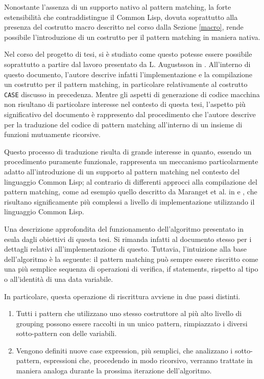 Nonostante l'assenza di un supporto nativo al pattern matching, la forte
estensibilità che contraddistingue il Common Lisp, dovuta soprattutto alla
presenza del costrutto macro descritto nel corso dalla Sezione \ref{macro},
rende possibile l'introduzione di un costrutto per il pattern matching in
maniera nativa.

Nel corso del progetto di tesi, si è studiato come questo potesse essere
possibile soprattutto a partire dal lavoro presentato da L. Augustsson in
\cite{DBLP:conf/fpca/Augustsson85}. All'interno di questo documento, l'autore
descrive infatti l'implementazione e la compilazione un costrutto per il pattern
matching, in particolare relativamente al costrutto \texttt{CASE} discusso in
precedenza. Mentre gli aspetti di generazione di codice macchina non risultano
di particolare interesse nel contesto di questa tesi, l'aspetto più
significativo del documento è rappresento dal procedimento che l'autore descrive
per la traduzione del codice di pattern matching all'interno di un insieme di
funzioni mutuamente ricorsive.

Questo processo di traduzione risulta di grande interesse in quanto, essendo un
procedimento puramente funzionale, rappresenta un meccanismo particolarmente
adatto all'introduzione di un supporto al pattern matching nel contesto del
linguaggio Common Lisp; al contrario di differenti approcci alla compilazione
del pattern matching, come ad esempio quello descritto da Maranget et al. in
\cite{DBLP:conf/icfp/FessantM01} e \cite{DBLP:conf/lfp/Maranget92}, che
risultano significamente più complessi a livello di implementazione utilizzando
il linguaggio Common Lisp.

Una descrizione approfondita del funzionamento dell'algoritmo presentato in
\cite{DBLP:conf/fpca/Augustsson85} esula dagli obiettivi di questa tesi. Si
rimanda infatti al documento stesso per i dettagli relativi all'implementazione
di questo. Tuttavia, l'intuizione alla base dell'algoritmo è la seguente: il
pattern matching può sempre essere riscritto come una più semplice sequenza di
operazioni di verifica, if statements, rispetto al tipo o all'identità di una
data variabile.

In particolare, questa operazione di riscrittura avviene in due passi distinti.

\begin{enumerate}

\item Tutti i pattern che utilizzano uno stesso costruttore al più alto livello
di grouping possono essere raccolti in un unico pattern, rimpiazzato i diversi
sotto-pattern con delle variabili.

\item Vengono definiti nuove case expression, più semplici, che analizzano i
sotto-pattern, espressioni che, procedendo in modo ricorsivo, verranno trattate
in maniera analoga durante la prossima iterazione dell'algoritmo.

\end{enumerate}

